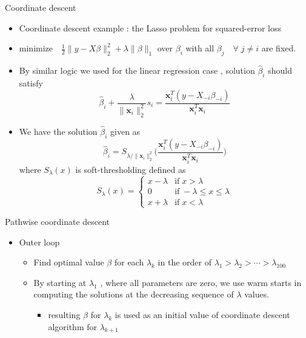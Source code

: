 \documentclass[11pt]{beamer}
\begin{document}
\begin{frame}{Coordinate descent}
    \begin{itemize}
        \item Coordinate descent example : the Lasso problem for squared-error loss
        \item $\text{minimize}\quad \frac 12 \|y-X\beta\|_2^2+\lambda\|\beta\|_1$ over $\beta_i$ with all $\beta_j\quad\forall \;j\neq i$ are fixed.
        \item By similar logic we used for the linear regression case , solution $\hat\beta_i$ should satisfy $$\hat\beta_i+\frac{\lambda}{\|\mathbf{x}_i\|_2^2}s_i=\frac{\mathbf{x}_i^T(y-X_{-i}\beta_{-i})}{\mathbf{x}_i^T\mathbf{x}_i} $$ 
        \item  We have the solution $\hat\beta_i$ given as
        $$\hat\beta_i = S_{\lambda / \|\mathbf{x}_i\|_2^2}\Big(\frac{\mathbf{x}_i^T(y-X_{-i}\beta_{-i})}{\mathbf{x}_i^T\mathbf{x}_i}\Big) $$ where $S_\lambda(x)$ is soft-thresholding defined as $$S_\lambda(x)=\begin{cases}
            x-\lambda & \text{if}\; x> \lambda \\
            0 & \text{if}\; -\lambda\leq x\leq \lambda \\
            x+\lambda & \text{if}\; x<\lambda
        \end{cases} $$
    \end{itemize}
\end{frame}

\begin{frame}{Pathwise coordinate descent}
    \begin{itemize}
        \item Outer loop
        \begin{itemize}
            \item Find optimal value $\beta$ for each $\lambda_k$ in the order of $\lambda_1>\lambda_2>\cdots > \lambda_{100}$
            \item By starting at $\lambda_1$ ,  where all parameters are zero, we use warm starts in computing the solutions at the decreasing sequence of $\lambda$ values. 
            \begin{itemize}
                \item resulting $\beta$ for $\lambda_k$ is used as an initial value of coordinate descent algorithm for $\lambda_{k+1}$ 
            \end{itemize}
        \end{itemize}
    \end{itemize}
\end{frame}
\end{document}
